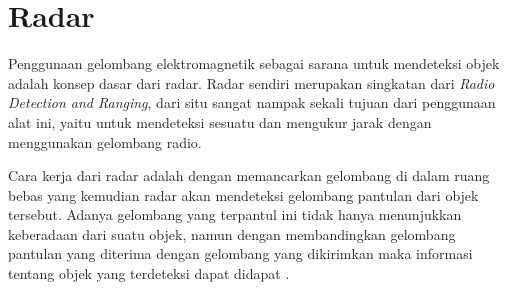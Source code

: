 %
%

\section{Radar}

Penggunaan gelombang elektromagnetik sebagai sarana untuk mendeteksi objek adalah konsep dasar dari radar. Radar sendiri merupakan singkatan dari \textit{Radio Detection and Ranging}, dari situ sangat nampak sekali tujuan dari penggunaan alat ini, yaitu untuk mendeteksi sesuatu dan mengukur jarak dengan menggunakan gelombang radio. 

Cara kerja dari radar adalah dengan memancarkan gelombang di dalam ruang bebas yang kemudian radar akan mendeteksi gelombang pantulan dari objek tersebut. Adanya gelombang yang terpantul ini tidak hanya menunjukkan keberadaan dari suatu objek, namun dengan membandingkan gelombang pantulan yang diterima dengan gelombang yang dikirimkan maka informasi tentang objek yang terdeteksi dapat didapat \cite{Skolnik2001}.

